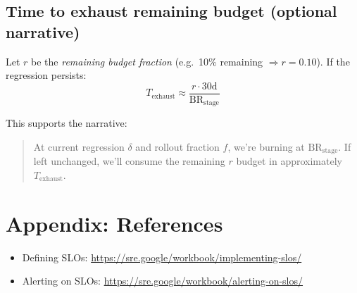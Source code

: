 \documentclass{article}
\begin{document}
\subsection*{Time to exhaust remaining budget (optional narrative)}
Let $r$ be the \emph{remaining budget fraction} (e.g.\ 10\% remaining $\Rightarrow r=0.10$). If the regression persists:
\[
T_{\text{exhaust}} \approx \frac{r \cdot 30\text{d}}{\mathrm{BR}_{\text{stage}}}
\]

This supports the narrative:
\begin{quote}
At current regression $\delta$ and rollout fraction $f$, we're burning at $\mathrm{BR}_{\text{stage}}$. If left unchanged, we'll consume the remaining $r$ budget in approximately $T_{\text{exhaust}}$.
\end{quote}

\section*{Appendix: References}

\begin{itemize}[leftmargin=1.4em]
    \item Defining SLOs: \href{Defining SLOs}{https://sre.google/workbook/implementing-slos/}
    \item Alerting on SLOs: \href{Alerting on SLOs}{https://sre.google/workbook/alerting-on-slos/}
\end{itemize}
\end{document}
